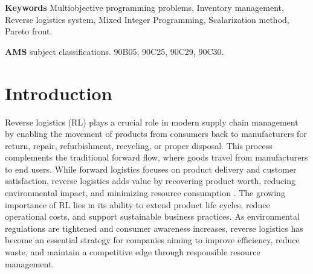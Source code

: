 \documentclass[11pt]{article}
\begin{document}
\textbf{Keywords} Multiobjective programming problems, Inventory management, Reverse logistics system, Mixed Integer Programming, Scalarization method, Pareto front.

\textbf{AMS} subject classifications. 90B05, 90C25, 90C29, 90C30.


\section{Introduction}\label{sec1}
\noindent Reverse logistics (RL) plays a crucial role in modern supply chain management by enabling the movement of products from consumers back to manufacturers for return, repair, refurbishment, recycling, or proper disposal. This process complements the traditional forward flow, where goods travel from manufacturers to end users. While forward logistics focuses on product delivery and customer satisfaction, reverse logistics adds value by recovering product worth, reducing environmental impact, and minimizing resource consumption \cite{Schrady1967,Dobos2004, Dobos2006}. The growing importance of RL lies in its ability to extend product life cycles, reduce operational costs, and support sustainable business practices. As environmental regulations are tightened and consumer awareness increases, reverse logistics has become an essential strategy for companies aiming to improve efficiency, reduce waste, and maintain a competitive edge through responsible resource management.
\end{document}
